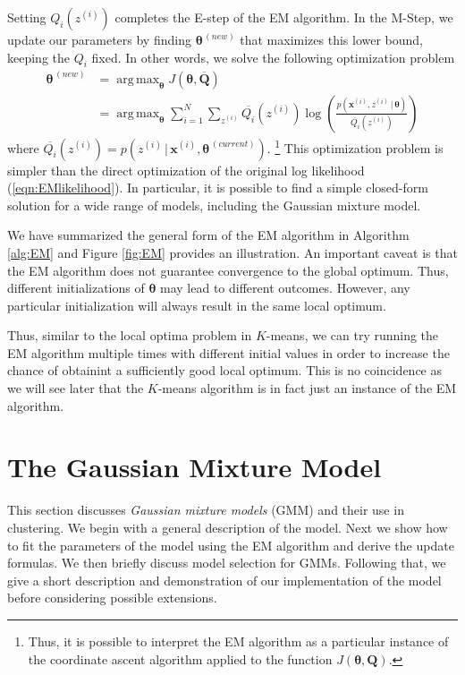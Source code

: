 \documentclass[final,3p,times,twocolumn]{elsarticle}
\DeclareMathOperator*{\argmax}{arg\,max}
\let\bs\boldsymbol
\let\ol\overline
\begin{document}
Setting $Q_i(z^{(i)})$ completes the E-step of the EM algorithm.
In the M-Step, we update our parameters by finding $\bs\theta^{\,(new)}$ that maximizes this lower bound, keeping the $Q_i$ fixed.
In other words, we solve the following optimization problem
\begin{equation}
\label{eqn:EM-M}
\begin{split}
\bs\theta^{\,(new)} &= \argmax_{\bs\theta} J(\bs\theta,\ol{\bs Q}) \\
&= \argmax_{\bs\theta}\sum_{i=1}^N \sum_{z^{(i)}} \ol{Q_i}(z^{(i)}) \log \left( \frac{p(\bs x^{(i)},z^{(i)}\,|\,\bs\theta)}{\ol{Q_i}(z^{(i)})}\right) 
\end{split}
\end{equation}
where $\ol{Q_i}(z^{(i)}) = p(z^{(i)}\,|\,\bs x^{(i)},\bs\theta^{\,(current)})$.
\footnote{Thus, it is possible to interpret the EM algorithm as a particular instance of the coordinate ascent algorithm applied to the function $J(\bs\theta,\bs Q)$.}
This optimization problem is simpler than the direct optimization of the original log likelihood (\ref{eqn:EMlikelihood}).
In particular, it is possible to find a simple closed-form solution for a wide range of models, including the Gaussian mixture model.

We have summarized the general form of the EM algorithm in Algorithm \ref{alg:EM} and Figure \ref{fig:EM} provides an illustration.
An important caveat is that the EM algorithm does not guarantee convergence to the global optimum.
Thus, different initializations of $\bs\theta$ may lead to different outcomes.
However, any particular initialization will always result in the same local optimum.

Thus, similar to the local optima problem in $K$-means, we can try running the EM algorithm multiple times with different initial values in order to increase the chance of obtainint a sufficiently good local optimum.
This is no coincidence as we will see later that the $K$-means algorithm is in fact just an instance of the EM algorithm.

\section{The Gaussian Mixture Model}
\label{sect:gmm}
This section discusses \emph{Gaussian mixture models} (GMM) and their use in clustering.
We begin with a general description of the model.
Next we show how to fit the parameters of the model using the EM algorithm and derive the update formulas.
We then briefly discuss model selection for GMMs.
Following that, we give a short description and demonstration of our implementation of the model before considering possible extensions.
\end{document}
